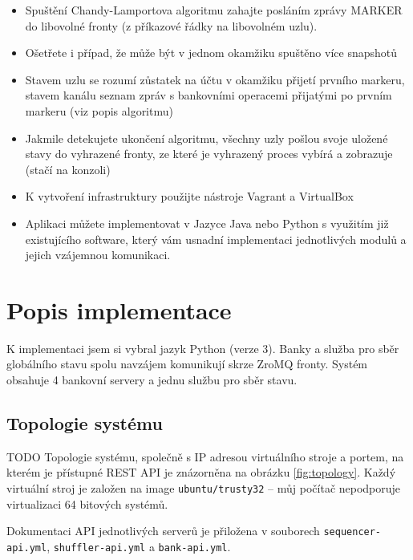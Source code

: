 \documentclass[11pt,a4paper]{scrartcl}
\begin{document}
\begin{itemize}
		\item Spuštění Chandy-Lamportova algoritmu zahajte posláním zprávy MARKER do libovolné fronty (z příkazové
		řádky na libovolném uzlu).

		\item Ošetřete i případ, že může být v jednom okamžiku spuštěno více snapshotů

		\item Stavem uzlu se rozumí zůstatek na účtu v okamžiku přijetí prvního markeru, stavem kanálu seznam zpráv s
		bankovními operacemi přijatými po prvním markeru (viz popis algoritmu)

		\item Jakmile detekujete ukončení algoritmu, všechny uzly pošlou svoje uložené stavy do vyhrazené fronty, ze které
		je vyhrazený proces vybírá a zobrazuje (stačí na konzoli)

		\item K vytvoření infrastruktury použijte nástroje Vagrant a VirtualBox

		\item Aplikaci můžete implementovat v Jazyce Java nebo Python s využitím již existujícího software, který vám
		usnadní implementaci jednotlivých modulů a jejich vzájemnou komunikaci.
	\end{itemize}
	
	
	
	\section{Popis implementace}
	K implementaci jsem si vybral jazyk Python (verze 3). Banky a služba pro sběr globálního stavu spolu navzájem komunikují skrze ZroMQ fronty. Systém obsahuje 4 bankovní servery a jednu službu pro sběr stavu.
	
	\subsection{Topologie systému}
	TODO
	Topologie systému, společně s IP adresou virtuálního stroje a portem, na kterém je přístupné REST API je znázorněna na obrázku \ref{fig:topology}. Každý virtuální stroj je založen na image \verb|ubuntu/trusty32| -- můj počítač nepodporuje virtualizaci 64 bitových systémů.
	
	Dokumentaci API jednotlivých serverů je přiložena v souborech \verb|sequencer-api.yml|, \verb|shuffler-api.yml| a \verb|bank-api.yml|.
	
\end{document}
